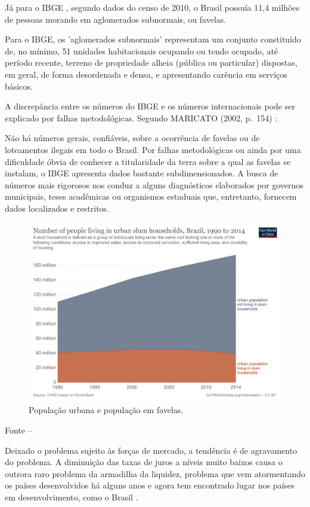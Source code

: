 \documentclass[
	12pt,				%
	oneside,			%
	a4paper,			%
	chapter=TITLE,		%
	section=TITLE,		%
	english,			%
	brazil				%
	]{abntex2}
\newcommand{\bcenter}{\begin{center}}
\newcommand{\ecenter}{\end{center}}
\begin{document}
\begin{refsection}
Já para o IBGE \autocite{ibge}, segundo dados do censo de 2010, o Brasil possuía 11,4
milhões de pessoas morando em aglomerados subnormais, ou favelas.
\begin{citacao}
Para o IBGE, os 'aglomerados subnormais' representam um conjunto constituído de,
no mínimo, 51 unidades habitacionais ocupando ou tendo ocupado, até período
recente, terreno de propriedade alheia (pública ou particular) dispostas, em
geral, de forma desordenada e densa, e apresentando carência em serviços
básicos.
\cite{ibge2}
\end{citacao}
A discrepância entre os números do IBGE e os números internacionais pode ser
explicado por falhas metodológicas. Segundo MARICATO (2002, p.~154) \autocite[\emph{apud}][9]{silva}:
\begin{citacao}
Não há números gerais, confiáveis, sobre a ocorrência de favelas ou de
loteamentos ilegais em todo o Brasil. Por falhas metodológicas ou ainda por uma
dificuldade óbvia de conhecer a titularidade da terra sobre a qual as favelas se
instalam, o IBGE apresenta dados bastante subdimensionados. A busca de números
mais rigorosos nos conduz a alguns diagnósticos elaborados por governos
municipais, teses acadêmicas ou organismos estaduais que, entretanto, fornecem
dados localizados e restritos.
\end{citacao}
\begin{figure}[H]

{\centering \includegraphics[width=0.7\linewidth]{images/urban-pop-in-out-of-slums} 

}

\caption{População urbana e população em favelas.}\label{fig:slums}
\end{figure}
\bcenter

\small Fonte -- \textcite{ritchie_urbanization_2018}
\ecenter

Deixado o problema sujeito às forças de mercado, a tendência é de agravamento do
problema. A diminuição das taxas de juros a níveis muito baixos causa o
outrora raro problema da armadilha da liquidez, problema que vem atormentando os
países desenvolvidos há alguns anos e agora tem encontrado lugar nos países em
desenvolvimento, como o Brasil \autocite{krugman-emergentes}.


\end{refsection}
\end{document}
